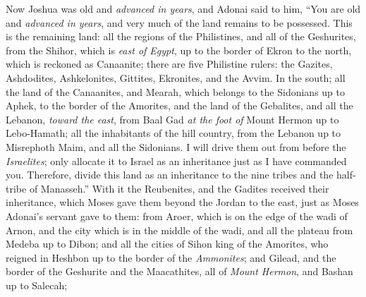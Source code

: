\begin{biblechapter} %
 Now Joshua was old and \textit{advanced in years}, and Adonai said to him, “You are old and \textit{advanced in years}, and very much of the land remains to be possessed.
\verse This is the remaining land: all the regions of the Philistines, and all of the Geshurites,
\verse from the Shihor, which is \textit{east of Egypt}, up to the border of Ekron to the north, which is reckoned as Canaanite; there are five Philistine rulers: the Gazites, Ashdodites, Ashkelonites, Gittites, Ekronites, and the Avvim.
\verse In the south; all the land of the Canaanites, and Mearah, which belongs to the Sidonians up to Aphek, to the border of the Amorites,
\verse and the land of the Gebalites, and all the Lebanon, \textit{toward the east}, from Baal Gad \textit{at the foot of} Mount Hermon up to Lebo-Hamath;
\verse all the inhabitants of the hill country, from the Lebanon up to Misrephoth Maim, and all the Sidonians. I will drive them out from before the \textit{Israelites}; only allocate it to Israel as an inheritance just as I have commanded you.
\verse Therefore, divide this land as an inheritance to the nine tribes and the half-tribe of Manasseh.”
\verse With it the Reubenites, and the Gadites received their inheritance, which Moses gave them beyond the Jordan to the east, just as Moses Adonai’s servant gave to them:
\verse from Aroer, which is on the edge of the wadi of Arnon, and the city which is in the middle of the wadi, and all the plateau from Medeba up to Dibon;
\verse and all the cities of Sihon king of the Amorites, who reigned in Heshbon up to the border of the \textit{Ammonites};
\verse and Gilead, and the border of the Geshurite and the Maacathites, all of \textit{Mount Hermon}, and Bashan up to Salecah;

\end{biblechapter}
